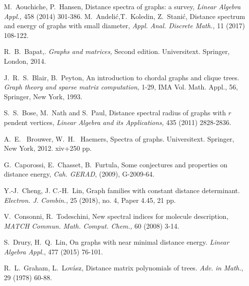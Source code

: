\documentclass[10pt]{article}
\begin{document}
\begin{thebibliography}{}



M.~Aouchiche, P.~Hansen, Distance spectra of graphs: a survey, {\it Linear Algebra Appl.,} 458 (2014) 301-386.
 M.~Andeli\'{c},T.~Koledin, Z.~Stani\'{c},  Distance spectrum and energy of graphs with small diameter, {\it Appl. Anal. Discrete Math.,} 11 (2017) 108-122.

 R.~B.~Bapat,. {\it Graphs and matrices,} Second edition. Universitext. Springer, London, 2014.

J.~R.~S.~Blair, B.~Peyton,  An introduction to chordal graphs and clique trees. {\it Graph theory and sparse matrix computation,} 1-29, IMA Vol. Math. Appl., 56, Springer, New York, 1993.

S.~S.~Bose, M.~Nath and S.~Paul, Distance spectral radius of graphs with $r$ pendent
vertices, {\it Linear Algebra and its Applications,} 435 (2011) 2828-2836.

A.~E. ~Brouwer, W.~H.~ Haemers, Spectra of graphs. Universitext. Springer, New York, 2012. xiv+250 pp.

G.~Caporossi, E.~Chasset, B.~Furtula, Some conjectures and properties on distance energy, {\it Cah.
GERAD}, (2009), G-2009-64.

Y.-J.~Cheng, J. C.-H.~Lin,  Graph families with constant distance determinant. {\it Electron. J. Combin.},  25 (2018), no. 4, Paper 4.45, 21 pp.

V.~Consonni, R.~Todeschini, New spectral indices for molecule description, {\it MATCH Commun. Math. Comput. Chem.,} 60 (2008) 3-14.

S.~Drury, H.~Q.~Lin, On graphs with near minimal distance energy. {\it Linear Algebra Appl.}, 477 (2015) 76-101.

R.~L.~Graham, L.~Lov\'{a}sz, Distance matrix polynomials of trees. {\it Adv. in Math.}, 29 (1978) 60-88.


\end{thebibliography}
\end{document}
